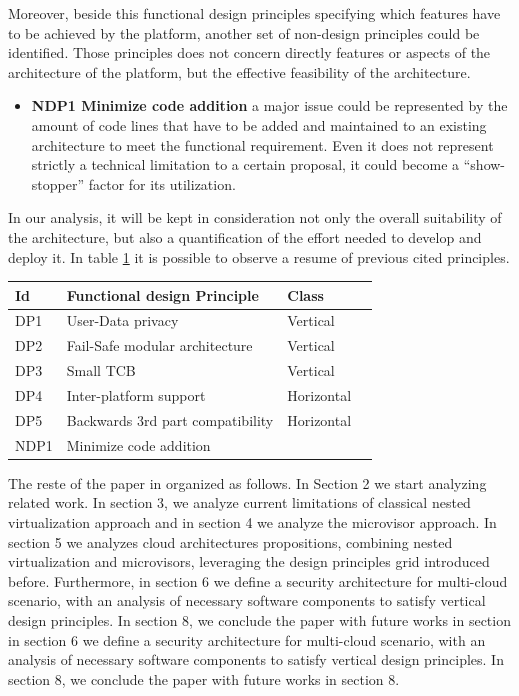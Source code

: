 \documentclass{sig-alternate}
\begin{document}
Moreover, beside this functional design principles specifying which features have to be achieved by the platform, another set of non-design principles could be identified. Those principles does not concern directly features or aspects of the architecture of the platform, but the effective feasibility of the architecture. 
\begin{itemize}[]
\item \textbf{NDP1 Minimize code addition} a major issue could be represented by the amount of code lines that have to be added and maintained to an existing architecture to meet the functional requirement. Even it does not represent strictly a technical limitation to a certain proposal, it could become a ``show-stopper'' factor for its utilization.
\end{itemize}
In our analysis, it will be kept in consideration not only the overall suitability of the architecture, but also a quantification of the effort needed to develop and deploy it. In table \ref{int:des} it is possible to observe a resume of previous cited principles.
 
\begin{table}
\label{int:des}
\begin{tabular}{llll}
\toprule
Id & Functional design Principle & Class &\\
\midrule
   DP1 & User-Data privacy & Vertical & \\
   DP2 & Fail-Safe modular architecture & Vertical & \\ 
   DP3 & Small TCB & Vertical & \\
   DP4 & Inter-platform support & Horizontal & \\
   DP5 & Backwards 3rd part compatibility & Horizontal \\
   NDP1 & Minimize code addition & & \\
\bottomrule
      \end{tabular}
\end{table}

The reste of the paper in organized as follows. In Section 2 we start analyzing related work. In section 3, we analyze current limitations of classical nested virtualization approach and in section 4 we analyze the microvisor approach. In section 5 we analyzes cloud architectures propositions, combining nested virtualization and microvisors, leveraging the design principles grid introduced before. Furthermore, in section 6 we define a security architecture for multi-cloud scenario, with an analysis of necessary software components to satisfy vertical design principles. In section 8, we conclude the paper with future works in section  in section 6 we define a security architecture for multi-cloud scenario, with an analysis of necessary software components to satisfy vertical design principles. In section 8, we conclude the paper with future works in section 8. 
 
\end{document}
